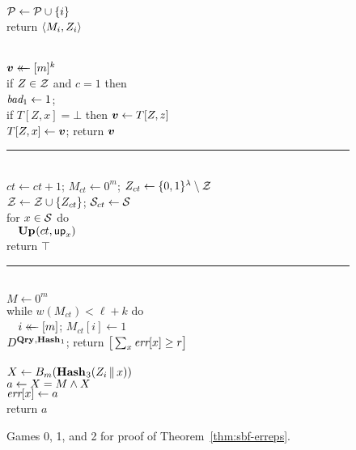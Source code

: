 \begin{figure*}
{  \\[2pt]
    $\mathcal{P} \gets \mathcal{P} \cup \{i\}$\\
    return $\langle M_i, Z_i\rangle$
}
{
  \vspace{-7pt}
  \hfill{}\\[2pt]
    $\boldsymbol{v} \mathrel{\leftarrow\mkern-14mu\leftarrow} [m]^k$\\
    if $Z \in \mathcal{Z}$ and $c = 1$ then \\
    \tab $\textit{bad}_1 \gets 1$; \\
    if $T[Z,x] = \bot$ then $\boldsymbol{v} \gets T[Z,z]$\\
    $T[Z,x] \gets \boldsymbol{v}$; return $\boldsymbol{v}$

  \vspace{6pt}\hrule\vspace{3pt}

  \oraclev{$\REPO(\col)$}\hfill{}\\[2pt]
    $ct \gets ct+1$;
    $M_{ct} \gets 0^m$;
    $Z_{ct} \gets \{0,1\}^\lambda\setminus \mathcal{Z}$\\
    $\mathcal{Z} \gets \mathcal{Z} \cup \{Z_{ct}\}$;
    $\mathcal{S}_{ct} \gets \mathcal{S}$\\
    for $x \in \mathcal{S}$ do\\
    $\hspace*{10pt}\textup{\textbf{Up}}\hspace{0.5pt}(ct, \mathsf{up}_x)$\\
    return $\top$

  \vspace{6pt}\hrule\vspace{3pt}

  \\[2pt]
    $M \gets 0^m$\\
    while $w(M_{ct}) < \ell+k$ do\\
    $\hspace*{10pt} i \mathrel{\leftarrow\mkern-14mu\leftarrow} [m]$;
    $M_{ct}[i] \gets 1$\\
    $D^{\textup{\textbf{Qry}}\hspace{0.5pt},\textup{\textbf{Hash}}\hspace{0.5pt}_1}$;
    return $\big[\sum_x \textit{err}[x] \geq r\big]$
  \\[6pt]
  \\[2pt]
    $X \gets {B}_m(\textup{\textbf{Hash}}\hspace{0.5pt}_3(Z_i \, \| \, x))$\\
    $a \gets X = M \wedge X$\\
    $\textit{err}[x] \gets a$\\
    return $a$
}
\caption{Games 0, 1, and 2 for proof of Theorem~\ref{thm:sbf-erreps}.}
\label{fig:sbf-erreps/games}
\end{figure*}

